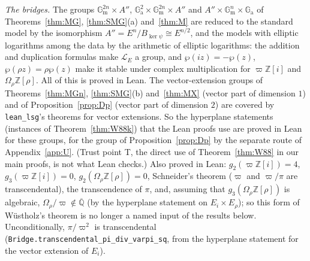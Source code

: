\documentclass[11pt]{amsart}
\theoremstyle{definition}
\newcommand{\Qb}{\overline{\mathbb{Q}}}
\newcommand{\Z}{\mathbb{Z}}
\newcommand{\Ga}{\mathbb{G}_{\mathrm a}}
\newcommand{\Gm}{\mathbb{G}_{\mathrm m}}
\newcommand{\Lg}{\mathcal{L}}
\newcommand{\vp}{\varpi}
\begin{document}
\emph{The bridges.} The groups $\Gm^{2n}\times A''$, $\Ga^2\times\Gm^{2n}\times A''$ and $A''\times\Gm^n\times\Ga$ of
Theorems~\ref{thm:MG}, \ref{thm:SMG}(a) and~\ref{thm:M} are reduced to the standard model by the isomorphism
$A''=E^n/B_{\ker\psi}\cong E^{n/2}$, and the models with elliptic logarithms among the data by the arithmetic of elliptic
logarithms: the addition and duplication formulas make $\Lg_E$ a group, and $\wp(iz)=-\wp(z)$, $\wp(\rho z)=\rho\wp(z)$ make
it stable under complex multiplication for $\vp\Z[i]$ and $\Omega_\rho\Z[\rho]$. All of this is proved in Lean. The
vector-extension groups of Theorems~\ref{thm:MGn}, \ref{thm:SMG}(b) and~\ref{thm:MX} (vector part of dimension $1$) and of
Proposition~\ref{prop:Dp} (vector part of dimension $2$) are covered by \texttt{lean\_lsg}'s theorems for vector extensions.
So the hyperplane statements (instances of Theorem~\ref{thm:W88k}) that the Lean proofs use are proved in Lean for these
groups, for the group of Proposition~\ref{prop:Dp} by the separate route of Appendix~\ref{app:U}. (Trust point T, the
direct use of Theorem~\ref{thm:W88} in our main proofs, is not what Lean checks.) Also
proved in Lean: $g_2(\vp\Z[i])=4$, $g_3(\vp\Z[i])=0$, $g_2(\Omega_\rho\Z[\rho])=0$, Schneider's theorem ($\vp$ and $\vp/\pi$
are transcendental), the transcendence of $\pi$, and, assuming that $g_3(\Omega_\rho\Z[\rho])$ is algebraic,
$\Omega_\rho/\vp\notin\Qb$ (by the hyperplane statement on $E_i\times E_\rho$); so this form of W\"ustholz's theorem is no
longer a named input of the results below. Unconditionally, $\pi/\vp^2$ is transcendental
(\texttt{Bridge.transcendental\_pi\_div\_varpi\_sq}, from the hyperplane statement for the vector extension of $E_i$).
\end{document}

